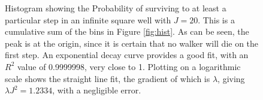 \documentclass[journal]{IEEEtran}
\begin{document}
\begin{figure}%
  \centering
  \centering
  \caption{Histogram showing the Probability of surviving to at least a
      particular step in an infinite square well with $J = 20$. This is a
      cumulative sum of the bins in Figure \ref{fig:hist}. As can be seen, the
      peak is at the origin, since it is certain that no walker will die on the
      first step. An exponential decay curve provides a good fit, with an $R^2$
      value of 0.9999998, very close to 1. Plotting on a logarithmic scale shows
      the straight line fit, the gradient of which is $\lambda$, giving $\lambda
      J^2 = 1.2334$, with a negligible error.}
  \label{fig:cumplots}
\end{figure}

\end{document}
